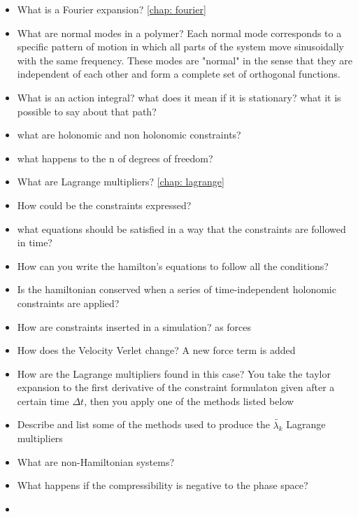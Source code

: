 \begin{enumerate}
\begin{itemize}
        \item What is a Fourier expansion? \ref{chap: fourier}
        \item What are normal modes in a polymer? Each normal mode corresponds to a specific pattern of motion in which all parts of the system move sinusoidally with the same frequency. These modes are "normal" in the sense that they are independent of each other and form a complete set of orthogonal functions.
        \item What is an action integral? what does it mean if it is stationary? what it is possible to say about that path?
        \item what are holonomic and non holonomic constraints?
        \item what happens to the n of degrees of freedom?
        \item What are Lagrange multipliers? \ref{chap: lagrange}
        \item How could be the constraints expressed?
        \item what equations should be satisfied in a way that the constraints are followed in time?
        \item How can you write the hamilton's equations to follow all the conditions?
        \item Is the hamiltonian conserved when a series of time-independent holonomic constraints are applied?
        \item How are constraints inserted in a simulation? as forces
        \item How does the Velocity Verlet change? A new force term is added
        \item How are the Lagrange multipliers found in this case? You take the taylor expansion to the first derivative of the constraint formulaton given after a certain time $\Delta t$, then you apply one of the methods listed below
        \item Describe and list some of the methods used to produce the $\tilde{\lambda_k}$ Lagrange multipliers
        \item What are non-Hamiltonian systems?
        \item What happens if the compressibility is negative to the phase space?
        \item 
    \end{itemize}


\end{enumerate}
